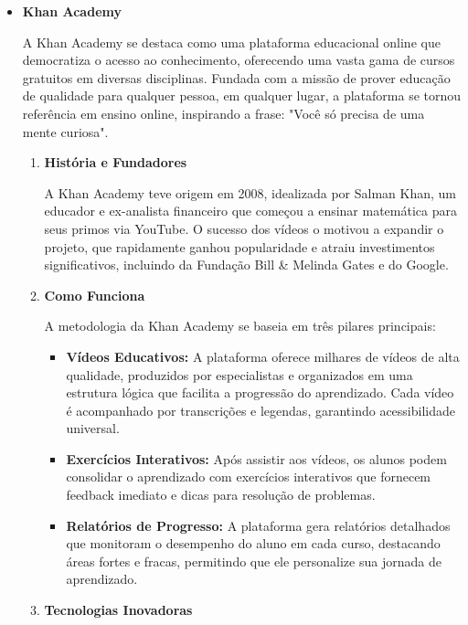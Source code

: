     \begin{itemize}
    \item \textbf{Khan Academy}

    A Khan Academy se destaca como uma plataforma educacional online que democratiza o acesso ao conhecimento, oferecendo uma vasta gama de cursos gratuitos em diversas disciplinas. Fundada com a missão de prover educação de qualidade para qualquer pessoa, em qualquer lugar, a plataforma se tornou referência em ensino online, inspirando a frase: "Você só precisa de uma mente curiosa".

    \begin{enumerate}
        \item \textbf{História e Fundadores}
        
        A Khan Academy teve origem em 2008, idealizada por Salman Khan, um educador e ex-analista financeiro que começou a ensinar matemática para seus primos via YouTube. O sucesso dos vídeos o motivou a expandir o projeto, que rapidamente ganhou popularidade e atraiu investimentos significativos, incluindo da Fundação Bill \& Melinda Gates e do Google.

        \item \textbf{Como Funciona}
        
        A metodologia da Khan Academy se baseia em três pilares principais:

        \begin{itemize}
            \item \textbf{Vídeos Educativos:} A plataforma oferece milhares de vídeos de alta qualidade, produzidos por especialistas e organizados em uma estrutura lógica que facilita a progressão do aprendizado. Cada vídeo é acompanhado por transcrições e legendas, garantindo acessibilidade universal.
            \item \textbf{Exercícios Interativos:} Após assistir aos vídeos, os alunos podem consolidar o aprendizado com exercícios interativos que fornecem feedback imediato e dicas para resolução de problemas.
            \item \textbf{Relatórios de Progresso:} A plataforma gera relatórios detalhados que monitoram o desempenho do aluno em cada curso, destacando áreas fortes e fracas, permitindo que ele personalize sua jornada de aprendizado.
        \end{itemize}

        \item \textbf{Tecnologias Inovadoras}
        

\end{enumerate}
\end{itemize}
